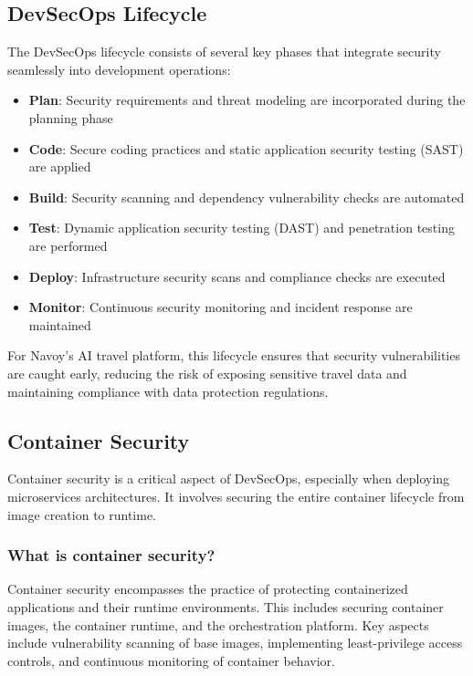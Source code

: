 \subsection{DevSecOps Lifecycle}
The DevSecOps lifecycle consists of several key phases that integrate security seamlessly into development operations:

\begin{itemize}
    \item \textbf{Plan}: Security requirements and threat modeling are incorporated during the planning phase
    \item \textbf{Code}: Secure coding practices and static application security testing (SAST) are applied
    \item \textbf{Build}: Security scanning and dependency vulnerability checks are automated
    \item \textbf{Test}: Dynamic application security testing (DAST) and penetration testing are performed
    \item \textbf{Deploy}: Infrastructure security scans and compliance checks are executed
    \item \textbf{Monitor}: Continuous security monitoring and incident response are maintained
\end{itemize}

For Navoy's AI travel platform, this lifecycle ensures that security vulnerabilities are caught early, reducing the risk of exposing sensitive travel data and maintaining compliance with data protection regulations.

\subsection{Container Security}
Container security is a critical aspect of DevSecOps, especially when deploying microservices architectures. It involves securing the entire container lifecycle from image creation to runtime.

\subsubsection*{What is container security?}
Container security encompasses the practice of protecting containerized applications and their runtime environments. This includes securing container images, the container runtime, and the orchestration platform. Key aspects include vulnerability scanning of base images, implementing least-privilege access controls, and continuous monitoring of container behavior.

